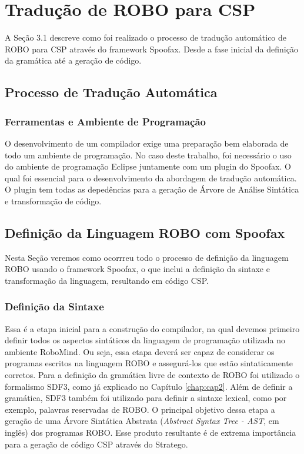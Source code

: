 \chapter{Tradução de ROBO para CSP}
A Seção 3.1 descreve como foi realizado o processo de tradução automático de ROBO para CSP através do framework Spoofax. Desde a fase inicial da definição da gramática até a geração de código.

\section{Processo de Tradução Automática}

\subsection{Ferramentas e Ambiente de Programação}
O desenvolvimento de um compilador exige uma preparação bem elaborada de todo um ambiente de programação. No caso deste trabalho, foi necessário o uso do ambiente de programação Eclipse juntamente com um plugin do Spoofax. O qual foi essencial para o desenvolvimento da abordagem de tradução automática. O plugin tem todas as depedências para a geração de Árvore de Análise Sintática e transformação de código.

\section{Definição da Linguagem ROBO com Spoofax}
Nesta Seção veremos como ocorrreu todo o processo de definição da linguagem ROBO usando o framework Spoofax, o que inclui a definição da sintaxe e transformação da linguagem, resultando em código CSP.
\subsection{Definição da Sintaxe}
Essa é a etapa inicial para a construção do compilador, na qual devemos primeiro definir todos os aspectos sintáticos da linguagem de programação utilizada no ambiente RoboMind. Ou seja, essa etapa deverá ser capaz de considerar os programas escritos na linguagem ROBO e assegurá-los que estão sintaticamente corretos. Para a definição da gramática livre de contexto de ROBO foi utilizado o formalismo SDF3, como já explicado no Capítulo \ref{chap:cap2}. Além de definir a gramática, SDF3 também foi utilizado para definir a sintaxe lexical, como por exemplo, palavras reservadas de ROBO. O principal objetivo dessa etapa a geração de uma Árvore Sintática Abstrata (\textit{Abstract Syntax Tree - AST}, em inglês) dos programas ROBO. Esse produto resultante é de extrema importância para a geração de código CSP através do Stratego.

